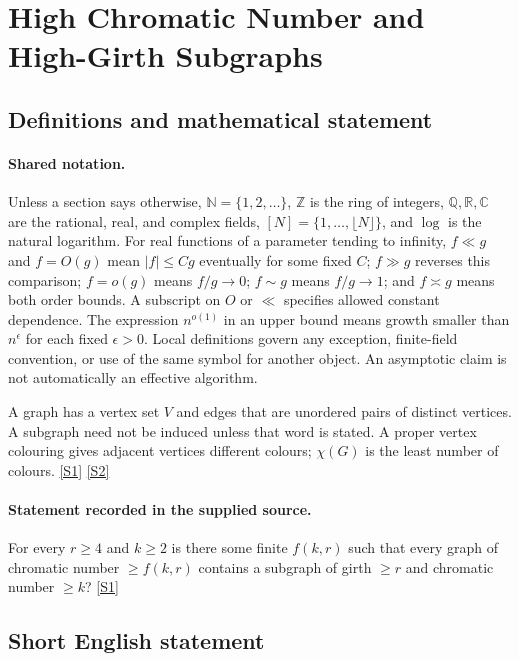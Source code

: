 \documentclass[11pt,a4paper]{article}
\newcommand{\N}{\mathbb{N}}
\newcommand{\Z}{\mathbb{Z}}
\newcommand{\Q}{\mathbb{Q}}
\newcommand{\R}{\mathbb{R}}
\newcommand{\C}{\mathbb{C}}
\newcommand{\sref}[2]{\hyperlink{source:#1:#2}{[S#2]}}
\begin{document}
\section{High Chromatic Number and High-Girth Subgraphs}\label{statement}


\subsection{Definitions and mathematical statement}

\paragraph{Shared notation.}Unless a section says otherwise, $\N=\{1,2,\ldots\}$,
$\Z$ is the ring of integers, $\Q,\R,\C$ are the rational, real, and complex
fields, $[N]=\{1,\ldots,\lfloor N\rfloor\}$, and $\log$ is the natural
logarithm. For real functions of a parameter tending to infinity,
$f\ll g$ and $f=O(g)$ mean $|f|\leq Cg$ eventually for some fixed $C$;
$f\gg g$ reverses this comparison; $f=o(g)$ means $f/g\to0$;
$f\sim g$ means $f/g\to1$; and $f\asymp g$ means both order bounds.
A subscript on $O$ or $\ll$ specifies allowed constant dependence.
The expression $n^{o(1)}$ in an upper bound means growth smaller than
$n^\epsilon$ for each fixed $\epsilon>0$. Local definitions govern any
exception, finite-field convention, or use of the same symbol for another
object. An asymptotic claim is not automatically an effective algorithm.



A graph has a vertex set $V$ and edges that are unordered pairs of distinct vertices. A subgraph need not be induced unless that word is stated. A proper vertex colouring gives adjacent vertices different colours; $\chi(G)$ is the least number of colours. \sref{statement}{1} \sref{statement}{2}

\paragraph{Statement recorded in the supplied source.}
For every $r\geq 4$ and $k\geq 2$ is there some finite $f(k,r)$ such that every graph of chromatic number $\geq f(k,r)$ contains a subgraph of girth $\geq r$ and chromatic number $\geq k$? \sref{statement}{1}

\subsection{Short English statement}
\end{document}

